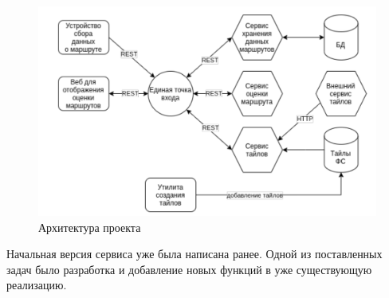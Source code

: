 \documentclass[a4paper, 10pt]{article}
\begin{document}
	\begin{figure}[h!]
		\centering
		\includegraphics[scale=1]{arch}
		\centering\caption{Архитектура проекта}
	\end{figure}
    Начальная версия сервиса уже была написана ранее. Одной из поставленных задач было разработка и добавление новых функций в уже существующую реализацию. 
\end{document}
